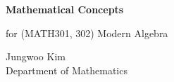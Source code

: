 \documentclass[11pt,oneside]{article}
\begin{document}
\thispagestyle{empty}

\begin{center}
    \vspace*{1.1cm}

    {\LARGE\bfseries Mathematical Concepts\par}

    \vspace{0.25cm}

    {\large for (MATH301, 302) Modern Algebra\par}

    \vspace{0.75cm}

    {\normalsize
    Jungwoo Kim\\
    Department of Mathematics\\
    \PohangUniversityOfScienceAndTechnology
    \par}
\end{center}
\end{document}
